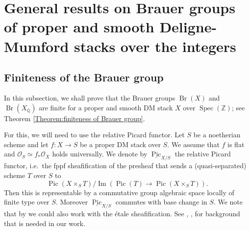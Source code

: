 \documentclass{amsart}
\theoremstyle{definition}
\theoremstyle{remark}
\DeclareMathOperator{\Image}{Im}
\DeclareMathOperator{\Spec}{Spec}
\DeclareMathOperator{\Br}{Br}
\DeclareMathOperator{\Pic}{Pic}
\newcommand{\ZZ}{\mathbb Z}
\newcommand{\QQ}{\mathbb Q}
\begin{document}
\section{General results on Brauer groups of proper and smooth Deligne-Mumford stacks over the integers}\label{section: General results on Brauer groups}

\subsection{Finiteness of the Brauer group}

In this subsection, we shall prove that
the Brauer groups
$
\Br(X)
$
and
$
\Br(X_{\overline{\QQ}})
$
are finite for a proper and smooth DM stack $X$ over $\Spec(\ZZ)$; see Theorem \ref{Theorem:finiteness of Brauer group}.

For this, we will need to use the relative Picard functor.
Let $S$ be a noetherian scheme and
let
$f\colon X\rightarrow S$
be a proper DM stack over $S$.
We assume that $f$ is flat and $\mathcal{O}_{S}\simeq f_{*}\mathcal{O}_{X}$ holds universally.
We denote by $\underline{\Pic}_{X/S}$ the relative Picard functor, i.e.\ the fppf sheafification of the presheaf that sends a (quasi-separated) scheme $T$ over $S$ to
$$
    \Pic(X\times_{S}T)/\Image(\Pic(T)\rightarrow \Pic(X\times_{S}T)).
$$
Then this is representable by a commutative group algebraic space locally of finite type over $S$.
Moreover $\underline{\Pic}_{X/S}$ commutes with base change in $S$.
We note that by \cite[Theorem 2.2.5]{BrochardPicardFunctorStack} we could also work with the étale sheafification.
See \cite[Section 3]{fringuelli2023picardgroupschememoduli}, \cite{BrochardPicardFunctorStack}, \cite{BrochardPicardStackFiniteness} for background that is needed in our work.
\end{document}
